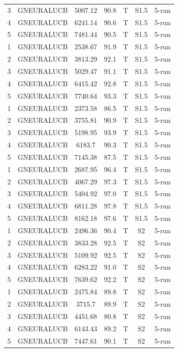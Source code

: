 \documentclass[11pt]{article}
\begin{document}
\begin{center}
\begin{longtable}{|c|c|c|c|c|c|c|}
3 & GNEURALUCB & 5007.12 & 90.8 & T & S1.5 & 5-run \\
4 & GNEURALUCB & 6241.14 & 90.6 & T & S1.5 & 5-run \\
5 & GNEURALUCB & 7481.44 & 90.5 & T & S1.5 & 5-run \\
1 & GNEURALUCB & 2538.67 & 91.9 & T & S1.5 & 5-run \\
2 & GNEURALUCB & 3813.29 & 92.1 & T & S1.5 & 5-run \\
3 & GNEURALUCB & 5029.47 & 91.1 & T & S1.5 & 5-run \\
4 & GNEURALUCB & 6415.42 & 92.8 & T & S1.5 & 5-run \\
5 & GNEURALUCB & 7740.64 & 93.3 & T & S1.5 & 5-run \\
1 & GNEURALUCB & 2373.58 & 86.5 & T & S1.5 & 5-run \\
2 & GNEURALUCB & 3755.81 & 90.9 & T & S1.5 & 5-run \\
3 & GNEURALUCB & 5198.95 & 93.9 & T & S1.5 & 5-run \\
4 & GNEURALUCB & 6183.7 & 90.3 & T & S1.5 & 5-run \\
5 & GNEURALUCB & 7145.38 & 87.5 & T & S1.5 & 5-run \\
1 & GNEURALUCB & 2687.95 & 96.4 & T & S1.5 & 5-run \\
2 & GNEURALUCB & 4067.29 & 97.3 & T & S1.5 & 5-run \\
3 & GNEURALUCB & 5404.92 & 97.0 & T & S1.5 & 5-run \\
4 & GNEURALUCB & 6811.28 & 97.8 & T & S1.5 & 5-run \\
5 & GNEURALUCB & 8162.18 & 97.6 & T & S1.5 & 5-run \\
1 & GNEURALUCB & 2496.36 & 90.4 & T & S2 & 5-run \\
2 & GNEURALUCB & 3833.28 & 92.5 & T & S2 & 5-run \\
3 & GNEURALUCB & 5109.92 & 92.5 & T & S2 & 5-run \\
4 & GNEURALUCB & 6283.22 & 91.0 & T & S2 & 5-run \\
5 & GNEURALUCB & 7639.62 & 92.2 & T & S2 & 5-run \\
1 & GNEURALUCB & 2475.84 & 89.8 & T & S2 & 5-run \\
2 & GNEURALUCB & 3715.7 & 89.9 & T & S2 & 5-run \\
3 & GNEURALUCB & 4451.68 & 80.8 & T & S2 & 5-run \\
4 & GNEURALUCB & 6143.43 & 89.2 & T & S2 & 5-run \\
5 & GNEURALUCB & 7447.61 & 90.1 & T & S2 & 5-run \\

\end{longtable}
\end{center}
\end{document}

